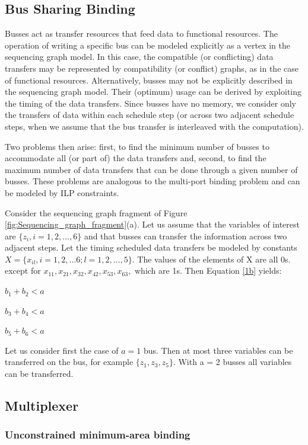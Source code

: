 \subsection{Bus Sharing Binding}

Busses act as transfer resources that feed data to functional resources. The operation of writing a specific bus can be modeled explicitly as a vertex in the sequencing graph model. In this case, the compatible (or conflicting) data transfers may be represented by compatibility (or conflict) graphs, as in the case of functional resources. Alternatively, busses may not be explicitly described in the sequencing graph model. Their  (optimum) usage can be derived by exploiting the timing of the data transfers. Since busses have no memory, we consider only the transfers of data within each schedule step (or across two adjacent schedule steps, when we assume that the bus transfer is interleaved with the computation). 

Two problems then arise: first, to find the minimum number of busses to accommodate all (or part of) the data transfers and, second, to find the maximum number of data transfers that can be done through a given number of busses. These problems are analogous to the multi-port binding problem and can be modeled by ILP constraints. 

Consider the sequencing graph fragment of Figure \ref{fig:Sequencing_graph_fragment}(a). Let us assume that the variables of interest are $ \{z_{i},i=1,2,...,6\} $ and that busses can transfer 
the information across two adjacent steps. Let the timing scheduled data transfers be 
modeled by constants $ X=\{x_{il},i=1,2,...6;l=1,2,...,5 \}$. The values of the elements of X are all 0s. except for $ x_{11},x_{21},x_{32},x_{42},x_{53},x_{63}, $ which are 1s. Then Equation \ref{1b} yields:

$ b_{1}+b_{2} < a $

$ b_{3}+b_{4} < a $

$ b_{5}+b_{6} < a $


Let us consider first the case of $ a = 1 $ bus. Then at most three variables can be transferred 
on the bus, for example $ \{z_{1},z_{3},z_{5}\} $. With a = 2 busses all variables can be transferred. 

\subsection{Multiplexer}

\subsubsection{Unconstrained minimum-area binding }
